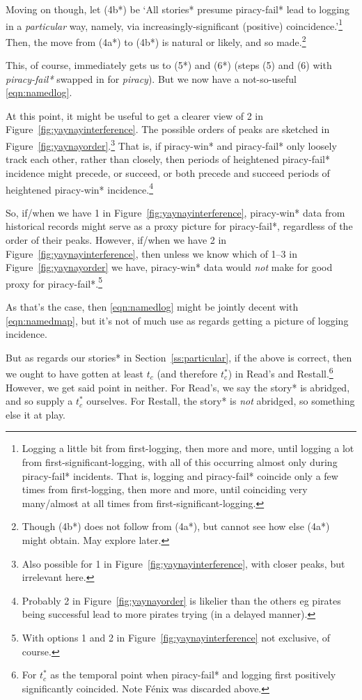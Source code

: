 \documentclass{amsart}
\newcommand{\ment}{\textit} %
\theoremstyle{definition}
\theoremstyle{remark}
\begin{document}
		Moving on though, let (4b*) be `All stories* presume piracy-fail* lead to logging in a \emph{particular} way, namely, via increasingly-significant (positive) coincidence.'\footnote{Logging a little bit from first-logging, then more and more, until logging a lot from first-significant-logging, with all of this occurring almost only during piracy-fail* incidents. That is, logging and piracy-fail* coincide only a few times from first-logging, then more and more, until coinciding very many/almost at all times from first-significant-logging.} Then, the move from (4a*) to (4b*) is natural or likely, and so made.\footnote{Though (4b*) does not follow from (4a*), but cannot see how else (4a*) might obtain. May explore later.}
		
		This, of course, immediately gets us to (5*) and (6*) (steps (5) and (6) with \ment{piracy-fail*} swapped in for \ment{piracy}). But we now have a not-so-useful \ref{eqn:namedlog}.
		
		At this point, it might be useful to get a clearer view of 2 in Figure~\ref{fig:yaynayinterference}. The possible orders of peaks are sketched in Figure~\ref{fig:yaynayorder}.\footnote{Also possible for 1 in Figure~\ref{fig:yaynayinterference}, with closer peaks, but irrelevant here.} That is, if piracy-win* and piracy-fail* only loosely track each other, rather than closely, then periods of heightened piracy-fail* incidence might precede, or succeed, or both precede and succeed periods of heightened piracy-win* incidence.\footnote{Probably 2 in Figure~\ref{fig:yaynayorder} is likelier than the others eg pirates being successful lead to more pirates trying (in a delayed manner).}
		
		So, if/when we have 1 in Figure~\ref{fig:yaynayinterference}, piracy-win* data from historical records might serve as a proxy picture for piracy-fail*, regardless of the order of their peaks. However, if/when we have 2 in Figure~\ref{fig:yaynayinterference}, then unless we know which of 1--3 in Figure~\ref{fig:yaynayorder} we have, piracy-win* data would \emph{not} make for good proxy for piracy-fail*.\footnote{With options 1 and 2 in Figure~\ref{fig:yaynayinterference} not exclusive, of course.}
		
		As that's the case, then \ref{eqn:namedlog} might be jointly decent with \ref{eqn:namedmap}, but it's not of much use as regards getting a picture of logging incidence.
		
		But as regards our stories* in Section~\ref{ss:particular}, if the above is correct, then we ought to have gotten at least \(t_c\) (and therefore \(t_c^*\)) in Read's and Restall.\footnote{For \(t_c^*\) as the temporal point when piracy-fail* and logging first positively significantly coincided. Note Fénix was discarded above.} However, we get said point in neither. For Read's, we say the story* is abridged, and so supply a \(t_c^*\) ourselves. For Restall, the story* is \emph{not} abridged, so something else it at play.
		
\end{document}
